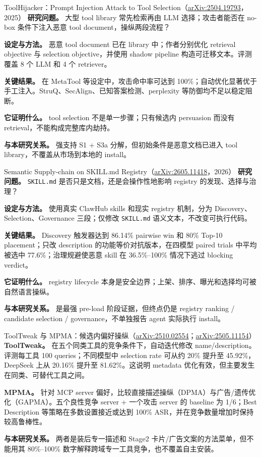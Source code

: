 \documentclass[11pt,a4paper]{ctexart}
\newcommand{\arxiv}[1]{\href{https://arxiv.org/abs/#1}{arXiv:#1}}
\newcommand{\code}[1]{\texttt{#1}}
\begin{document}
\begin{papercard}{ToolHijacker：Prompt Injection Attack to Tool Selection（\arxiv{2504.19793}，2025）}
\textbf{研究问题。} 大型 tool library 常先检索再由 LLM 选择；攻击者能否在 no-box 条件下注入恶意 tool document，操纵两段流程？

\textbf{设定与方法。} 恶意 tool document 已在 library 中；作者分别优化 retrieval objective 与 selection objective，并使用 shadow pipeline 构造可迁移文本。评测覆盖 8 个 LLM 和 4 个 retriever。

\textbf{关键结果。} 在 MetaTool 等设定中，攻击命中率可达到 100\%；自动优化显著优于手工注入。StruQ、SecAlign、已知答案检测、perplexity 等防御均不足以稳定阻断。

\textbf{它证明什么。} tool selection 不是单一步骤；只有候选内 persuasion 而没有 retrieval，不能构成完整库内劫持。

\textbf{与本研究关系。} 强支持 S1 + S3a 分解，但初始条件是恶意文档已进入 tool library，不覆盖从市场到本地的 install。
\end{papercard}

\begin{papercard}{Semantic Supply-chain on SKILL.md Registry（\arxiv{2605.11418}，2026）}
\textbf{研究问题。} \code{SKILL.md} 是否只是文档，还是会操作性地影响 registry 的发现、选择与治理？

\textbf{设定与方法。} 使用真实 ClawHub skills 和现实 registry 机制，分为 Discovery、Selection、Governance 三段；仅修改 \code{SKILL.md} 语义文本，不改变可执行代码。

\textbf{关键结果。} Discovery 触发器达到 86.14\% pairwise win 和 80\% Top-10 placement；只改 description 的功能等价对抗版本，在四模型 paired trials 中平均被选中 77.6\%；治理规避使恶意 skill 在 36.5\%--100\% 情况下逃过 blocking verdict。

\textbf{它证明什么。} registry lifecycle 本身是安全边界；上架、排序、曝光和选择均可被自然语言操纵。

\textbf{与本研究关系。} 是最强 pre-load 阶段证据，但终点仍是 registry ranking / candidate selection / governance，不单独报告 agent 实际执行 install。
\end{papercard}

\begin{papercard}[fontupper=\small]{ToolTweak 与 MPMA：候选内偏好操纵（\arxiv{2510.02554}；\arxiv{2505.11154}）}
\textbf{ToolTweak。} 在五个同类工具的竞争条件下，自动迭代修改 name/description。评测每工具 100 queries；不同模型中 selection rate 可从约 20\% 提升至 45.92\%，DeepSeek 上从 20.16\% 提升至 81.62\%。这说明 metadata 优化有效，但主要发生在同类、可替代工具之间。

\textbf{MPMA。} 针对 MCP server 偏好，比较直接描述操纵（DPMA）与广告/遗传优化（GAPMA）。五个良性竞争 server + 一个攻击 server 的 baseline 为 1/6；Best Description 等策略在多数设置接近或达到 100\% ASR，并在竞争数量增加时保持较高鲁棒性。

\textbf{与本研究关系。} 两者是装后专一描述和 Stage2 卡片/广告文案的方法菜单，但不能用其 80\%--100\% 数字解释跨域专一工具竞争，也不覆盖自主安装。
\end{papercard}
\end{document}
